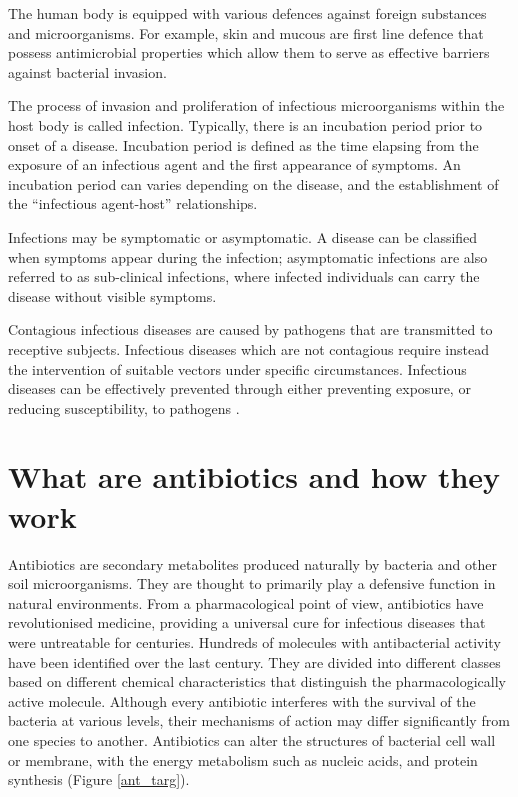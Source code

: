 \documentclass[11pt]{report}
\begin{document}
The human body is equipped with various defences against foreign substances and microorganisms. For example, skin and mucous are first line defence that possess antimicrobial properties which allow them to serve as effective barriers against bacterial invasion.

The process of invasion and proliferation of infectious microorganisms within the host body is called infection. Typically, there is an incubation period prior to onset of a disease. Incubation period is defined as the time elapsing from the exposure of an infectious agent and the first appearance of symptoms.  An incubation period can varies depending on the disease, and the establishment of the “infectious agent-host” relationships.

Infections may be symptomatic or asymptomatic. A disease can be classified when symptoms appear during the infection; asymptomatic infections are also referred to as sub-clinical infections, where infected individuals can carry the disease without visible symptoms.

Contagious infectious diseases are caused by pathogens that are transmitted to receptive subjects.
Infectious diseases which are not contagious require instead the intervention of suitable vectors under specific circumstances.
Infectious diseases can be effectively prevented through either preventing exposure, or reducing susceptibility, to pathogens \cite{EPICentro}.

\chapter{What are antibiotics and how they work}
Antibiotics are secondary metabolites produced naturally by bacteria and other soil microorganisms.
They are thought to primarily play a defensive function in natural environments.
From a pharmacological point of view, antibiotics have revolutionised medicine, providing a universal cure for infectious diseases that were untreatable for centuries.
Hundreds of molecules with antibacterial activity have been identified over the last century. They are divided into different classes based on different chemical characteristics that distinguish the pharmacologically active molecule.
Although every antibiotic interferes with the survival of the bacteria at various levels, their mechanisms of action may differ significantly from one species to another.
Antibiotics can alter the structures of bacterial cell wall or membrane, with the energy metabolism such as nucleic acids, and protein synthesis (Figure \ref{ant_targ}).
\end{document}

